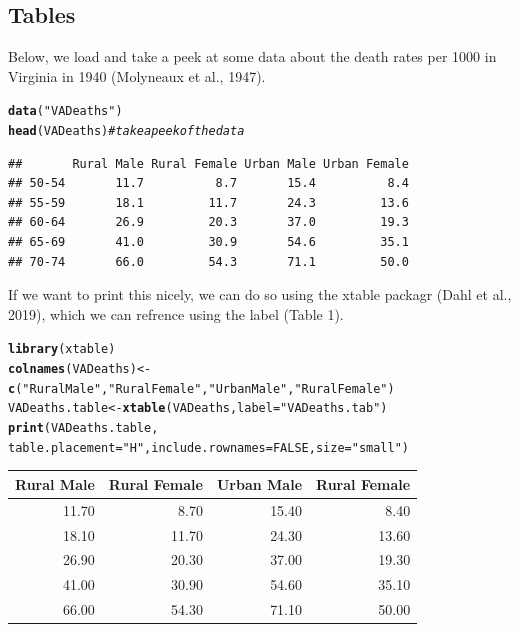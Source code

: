 \documentclass{article}\usepackage[]{graphicx}\usepackage[]{xcolor}
\makeatletter
\newcommand{\hlnum}[1]{\textcolor[rgb]{0.686,0.059,0.569}{#1}}%
\newcommand{\hlsng}[1]{\textcolor[rgb]{0.192,0.494,0.8}{#1}}%
\newcommand{\hlcom}[1]{\textcolor[rgb]{0.678,0.584,0.686}{\textit{#1}}}%
\newcommand{\hldef}[1]{\textcolor[rgb]{0.345,0.345,0.345}{#1}}%
\newcommand{\hlkwb}[1]{\textcolor[rgb]{0.69,0.353,0.396}{#1}}%
\newcommand{\hlkwc}[1]{\textcolor[rgb]{0.333,0.667,0.333}{#1}}%
\newcommand{\hlkwd}[1]{\textcolor[rgb]{0.737,0.353,0.396}{\textbf{#1}}}%
\newenvironment{kframe}{%
 \def\at@end@of@kframe{}%
 \ifinner\ifhmode%
  \def\at@end@of@kframe{\end{minipage}}%
  \begin{minipage}{\columnwidth}%
 \fi\fi%
 \def\FrameCommand##1{\hskip\@totalleftmargin \hskip-\fboxsep
 \colorbox{shadecolor}{##1}\hskip-\fboxsep
     \hskip-\linewidth \hskip-\@totalleftmargin \hskip\columnwidth}%
 \MakeFramed {\advance\hsize-\width
   \@totalleftmargin\z@ \linewidth\hsize
   \@setminipage}}%
 {\par\unskip\endMakeFramed%
 \at@end@of@kframe}
\newenvironment{knitrout}{}{} %
\makeatother
\begin{document}
\begin{multicols}{2}
\subsection{Tables}
Below, we load and take a peek at some data about the death rates per 1000 in Virginia in 1940 (Molyneaux et al., 1947).
\begin{knitrout}\scriptsize
{}\color{fgcolor}\begin{kframe}
\begin{alltt}
\hlkwd{data}\hldef{(}\hlsng{"VADeaths"}\hldef{)}
\hlkwd{head}\hldef{(VADeaths)} \hlcom{#take a peek of the data}
\end{alltt}
\begin{verbatim}
##       Rural Male Rural Female Urban Male Urban Female
## 50-54       11.7          8.7       15.4          8.4
## 55-59       18.1         11.7       24.3         13.6
## 60-64       26.9         20.3       37.0         19.3
## 65-69       41.0         30.9       54.6         35.1
## 70-74       66.0         54.3       71.1         50.0
\end{verbatim}
\end{kframe}
\end{knitrout}
\indent If we want to print this nicely, we can do so using the xtable packagr (Dahl et al., 2019), which we can refrence using the label (Table 1).
\begin{kframe}
\begin{alltt}
\hlkwd{library}\hldef{(xtable)}
\hlkwd{colnames}\hldef{(VADeaths)}\hlkwb{<-}\hlkwd{c}\hldef{(}\hlsng{"Rural Male"}\hldef{,}\hlsng{"Rural Female"}\hldef{,}\hlsng{"Urban Male"}\hldef{,}\hlsng{"Rural Female"}\hldef{)}
\hldef{VADeaths.table}\hlkwb{<-}\hlkwd{xtable}\hldef{(VADeaths,}\hlkwc{label} \hldef{=} \hlsng{"VADeaths.tab"}\hldef{)}
\hlkwd{print}\hldef{(VADeaths.table,}
\hlkwc{table.placement} \hldef{=} \hlsng{"H"}\hldef{,} \hlkwc{include.rownames}\hldef{=}\hlnum{FALSE}\hldef{,} \hlkwc{size} \hldef{=} \hlsng{"small"}\hldef{)}
\end{alltt}
\end{kframe}%
\begin{table}[H]
\centering
\begingroup\small
\begin{tabular}{rrrr}
  \hline
Rural Male & Rural Female & Urban Male & Rural Female \\ 
  \hline
11.70 & 8.70 & 15.40 & 8.40 \\ 
  18.10 & 11.70 & 24.30 & 13.60 \\ 
  26.90 & 20.30 & 37.00 & 19.30 \\ 
  41.00 & 30.90 & 54.60 & 35.10 \\ 
  66.00 & 54.30 & 71.10 & 50.00 \\ 
   \hline
\end{tabular}
\endgroup
\label{VADeaths.tab}
\end{table}


\end{multicols}
\end{document}
